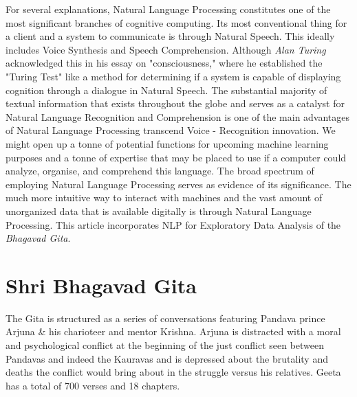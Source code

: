 \documentclass[runningheads]{llncs}
\begin{document}
For several explanations, Natural Language Processing constitutes one of the most significant branches of cognitive computing. Its most conventional thing for a client and a system to communicate is through Natural Speech. This ideally includes Voice Synthesis and Speech Comprehension. Although \textit{Alan Turing} acknowledged this in his essay on "consciousness," where he established the "Turing Test" like a method for determining if a system is capable of displaying cognition through a dialogue in Natural Speech. The substantial majority of textual information that exists throughout the globe and serves as a catalyst for Natural Language Recognition and Comprehension is one of the main advantages of Natural Language Processing transcend Voice - Recognition innovation. We might open up a tonne of potential functions for upcoming machine learning purposes and a tonne of expertise that may be placed to use if a computer could analyze, organise, and comprehend this language. The broad spectrum of employing Natural Language Processing serves as evidence of its significance. The much more intuitive way to interact with machines and the vast amount of unorganized data that is available digitally is through Natural Language Processing. This article incorporates NLP for Exploratory Data Analysis of the \textit{Bhagavad Gita}. 
\section{Shri Bhagavad Gita}
The Gita is structured as a series of conversations featuring Pandava prince Arjuna \& his charioteer and mentor Krishna. Arjuna is distracted with a moral and psychological conflict at the beginning of the just conflict seen between Pandavas and indeed the Kauravas and is depressed about the brutality and deaths the conflict would bring about in the struggle versus his relatives. Geeta has a total of 700 verses and 18 chapters.
\end{document}

